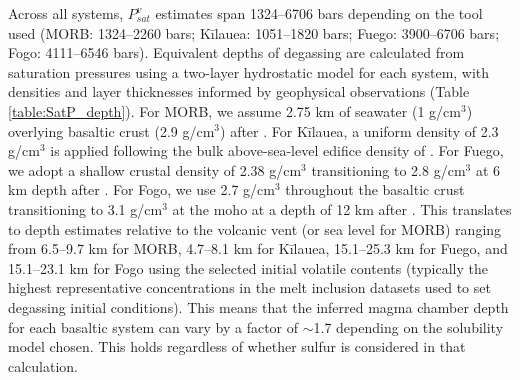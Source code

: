 \documentclass[draft, english]{volcanica-template}
\begin{document}
Across all systems, $P^v_{sat}$ estimates span 1324–6706 bars depending on the tool used (MORB: 1324–2260 bars; Kīlauea: 1051–1820 bars; Fuego: 3900–6706 bars; Fogo: 4111–6546 bars). Equivalent depths of degassing are calculated from saturation pressures using a two-layer hydrostatic model for each system, with densities and layer thicknesses informed by geophysical observations (Table \ref{table:SatP_depth}). For MORB, we assume 2.75 km of seawater (1 g/cm$^3$) overlying basaltic crust (2.9 g/cm$^3$) after \textcite{theunissen2022}. For Kīlauea, a uniform density of 2.3 g/cm$^3$ is applied following the bulk above-sea-level edifice density of \textcite{denlinger2022-kilauea-density}. For Fuego, we adopt a shallow crustal density of 2.38 g/cm$^3$ transitioning to 2.8 g/cm$^3$ at 6 km depth after \textcite{mickus2003}. For Fogo, we use 2.7 g/cm$^3$ throughout the basaltic crust transitioning to 3.1 g/cm$^3$ at the moho at a depth of 12 km after \textcite{forte2023}. This translates to depth estimates relative to the volcanic vent (or sea level for MORB) ranging from 6.5–9.7 km for MORB, 4.7–8.1 km for Kīlauea, 15.1–25.3 km for Fuego, and 15.1–23.1 km for Fogo using the selected initial volatile contents (typically the highest representative concentrations in the melt inclusion datasets used to set degassing initial conditions). This means that the inferred magma chamber depth for each basaltic system can vary by a factor of $\sim$1.7 depending on the solubility model chosen. This holds regardless of whether sulfur is considered in that calculation.
\end{document}
